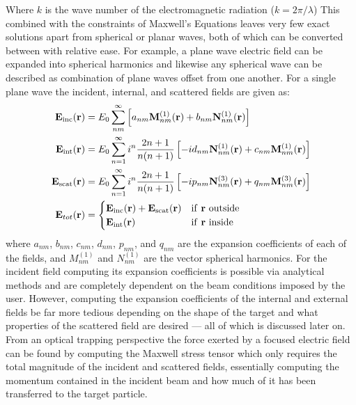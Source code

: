 Where $k$ is the wave number of the electromagnetic radiation ($k = 2\pi/\lambda$)
 This combined with the constraints of Maxwell's Equations leaves 
 very few exact solutions apart from spherical or planar waves, 
 both of which can be converted between with relative ease. For 
 example, a plane wave electric field can be expanded into spherical 
 harmonics and likewise any spherical wave can be described as 
 combination of plane waves offset from one another. For a single 
 plane wave the incident, internal, and scattered fields are given as:
\begin{align}
	\label{eq:lornez_mie}
  {\bf E}_{\rm inc}({\bf r})
  &=
    E_0 \sum_{nm}^\infty \left[
    a_{nm}{\bf M}_{nm}^{(1)}({\bf r})
    + b_{nm}{\bf N}_{nm}^{(1)}({\bf r})\right]
  \\
  \label{eq:internal}
  {\bf E}_{\rm int}({\bf r})
  &=
    E_0 \sum_{n=1}^\infty i^n\frac{2n+1}{n(n+1)}\left[
    -id_{nm}{\bf N}_{nm}^{(1)}({\bf r}) + c_{nm}{\bf M}_{nm}^{(1)}({\bf r})
    \right]
  \\
  {\bf E}_{\rm scat}({\bf r})
  &=
    E_0 \sum_{n=1}^\infty  i^n\frac{2n+1}{n(n+1)}\left[
      -i p_{nm}{\bf N}_{nm}^{(3)}({\bf r})+q_{nm}{\bf M}_{nm}^{(3)}({\bf r})
    \right] 
    \\
	\mathbf{E}_{tot}({\bf r}) &= 
	\begin{cases}
		{\bf E}_{\rm inc}({\bf r}) + {\bf E}_{\rm scat}({\bf r}) & \text{if \textbf{r} outside}
		\\ 
		{\bf E}_{\rm int}({\bf r}) & \text{if \textbf{r} inside}
	\end{cases}
\end{align}
where $a_{nm}$, $b_{nm}$, $c_{nm}$, $d_{nm}$, $p_{nm}$, and $q_{nm}$
are the expansion coefficients of each of the fields, and $M^{(1)}_{nm}$ 
and $N^{(1)}_{nm}$ are the vector spherical harmonics. For the incident
field computing its expansion coefficients is possible via analytical
methods and are completely dependent on the beam conditions imposed by
the user. However, computing the expansion coefficients of the
internal and external fields be far more tedious depending on the
shape of the target and what properties of the scattered field are
desired --- all of which is discussed later on.  From an optical
trapping perspective the force exerted by a focused electric field can
be found by computing the Maxwell stress tensor which only requires
the total magnitude of the incident and scattered fields, essentially
computing the momentum contained in the incident beam and how much of
it has been transferred to the target particle. 

